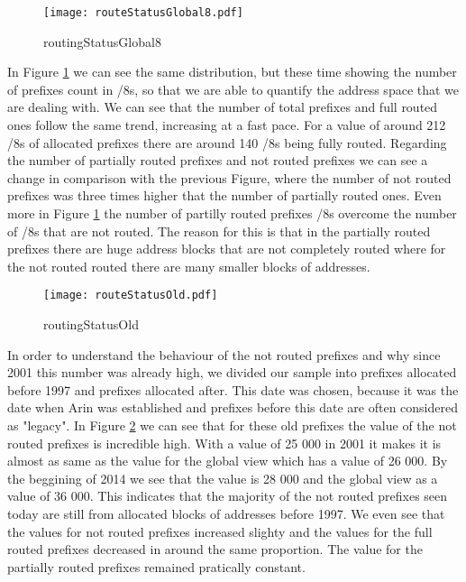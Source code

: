\documentclass[11pt,a4paper]{scrreprt}
\begin{document}
\begin{figure}[ht!]
\centering
\texttt{[image: routeStatusGlobal8.pdf]}
\caption{routingStatusGlobal8}
\label{fig:routingStatusGlobal8}
\end{figure}

In Figure \ref{fig:routingStatusGlobal8} we can see the same distribution, but these time showing the number of prefixes count in /8s, so that we are able to quantify the address space that we are dealing with. We can see that the number of total prefixes and full routed ones follow the same trend, increasing at a fast pace. For a value of around 212 /8s of allocated prefixes there are around 140 /8s being fully routed. Regarding the number of partially routed prefixes and not routed prefixes we can see a change in comparison with the previous Figure, where the number of not routed prefixes was three times higher that the number of partially routed ones. Even more in Figure \ref{fig:routingStatusGlobal8} the number of partilly routed prefixes /8s overcome the number of /8s that are not routed. The reason for this is that in the partially routed prefixes there are huge address blocks that are not completely routed where for the not routed routed there are many smaller blocks of addresses.  

\begin{figure}[ht!]
\centering
\texttt{[image: routeStatusOld.pdf]}
\caption{routingStatusOld}
\label{fig:routingStatusOld}
\end{figure}

In order to understand the behaviour of the not routed prefixes and why since 2001 this number was already high, we divided our sample into prefixes allocated before 1997 and prefixes allocated after. This date was chosen, because it was the date when Arin was established and prefixes before this date are often considered as "legacy".
In Figure \ref{fig:routingStatusOld} we can see that for these old prefixes the value of the not routed prefixes is incredible high. With a value of 25 000 in 2001 it makes it is almost as same as the value for the global view which has a value of 26 000. By the beggining of 2014 we see that the value is 28 000 and the global view as a value of 36 000. This indicates that the majority of the not routed prefixes seen today are still from allocated blocks of addresses before 1997. We even see that the values for not routed prefixes increased slighty and the values for the full routed prefixes decreased in around the same proportion. The value for the partially routed prefixes remained pratically constant.
\end{document}
